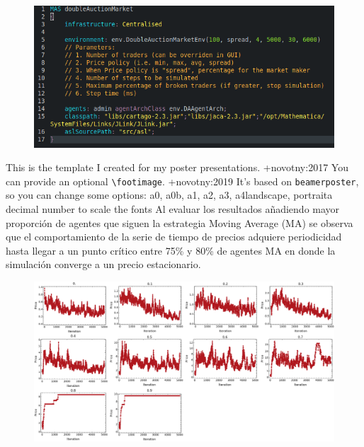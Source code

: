 \markdownRendererInterblockSeparator
{}\begin{figure}[h!] \centering \includegraphics[scale=0.4]{img/code.png} \end{figure}\markdownRendererInterblockSeparator
{}\markdownRendererUlBegin
\markdownRendererUlItem This is the template I created for my poster presentations. +{}{}{novotny:2017}\markdownRendererUlItemEnd 
\markdownRendererUlItem You can provide an optional \texttt{\textbackslash footimage}. +{}{}{novotny:2019}\markdownRendererUlItemEnd 
\markdownRendererUlEnd \markdownRendererInterblockSeparator
{}\markdownRendererHorizontalRule{}\markdownRendererInterblockSeparator
{}\markdownRendererInterblockSeparator
{}\markdownRendererUlBegin
\markdownRendererUlItem It's based on \texttt{beamerposter}, so you can change some options:\markdownRendererInterblockSeparator
{}\markdownRendererDlBegin
{}\markdownRendererDlDefinitionBegin a0, a0b, a1, a2, a3, a4\markdownRendererDlDefinitionEnd \markdownRendererDlItemEnd {}\markdownRendererDlDefinitionBegin landscape, portrait\markdownRendererDlDefinitionEnd \markdownRendererDlItemEnd {}\markdownRendererDlDefinitionBegin a decimal number to scale the fonts\markdownRendererDlDefinitionEnd \markdownRendererDlItemEnd 
\markdownRendererDlEnd\markdownRendererUlItemEnd 
\markdownRendererUlEnd \markdownRendererInterblockSeparator
{}\markdownRendererHorizontalRule{}\markdownRendererInterblockSeparator
{}\markdownRendererInterblockSeparator
{}Al evaluar los resultados añadiendo mayor proporción de agentes que siguen la estrategia Moving Average (MA) se observa que el comportamiento de la serie de tiempo de precios adquiere periodicidad hasta llegar a un punto crítico entre 75\% y 80\% de agentes MA en donde la simulación converge a un precio estacionario.\markdownRendererInterblockSeparator
{}\begin{figure}[h!] \centering \includegraphics[scale=0.2]{img/price_series.png} \end{figure}\markdownRendererInterblockSeparator
{}\markdownRendererHorizontalRule{}\relax